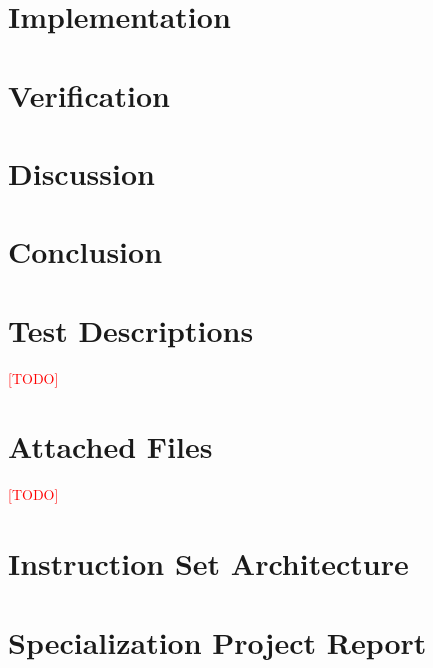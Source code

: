 \documentclass[a4paper]{report}
\newcommand\TODO{\textcolor{red}{[TODO]}}
\begin{document}
\chapter{Implementation}
    \label{ch:implementation}
    

\chapter{Verification}
    \label{ch:verification}
    

\chapter{Discussion}
    \label{ch:discussion}
    

\chapter{Conclusion}
    \label{ch:conclusion}
    

\newpage
{}
{}



\appendix

\chapter{Test Descriptions}

\TODO

\chapter{Attached Files}

\TODO

\chapter{Instruction Set Architecture}

%

\chapter{Specialization Project Report}

%
\end{document}
